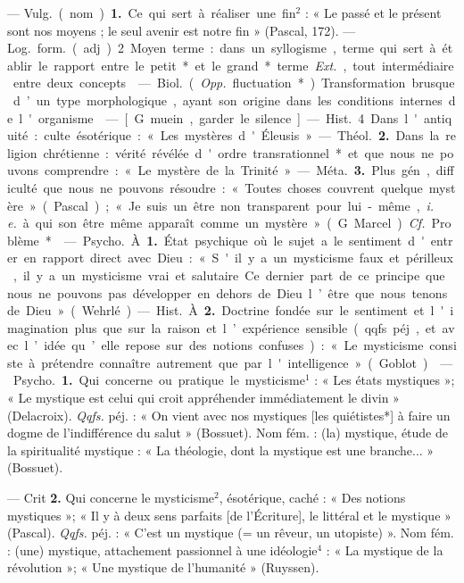\begin{itemize}[leftmargin=1cm, label=, itemsep=1pt]
 — \si{Vulg.} (nom). {\bf 1.} Ce qui sert
à réaliser une fin$^2$ : « Le passé et le
présent sont nos moyens ; le seul
avenir est notre fin » (Pascal, 172).
— \si{Log.} \si{form.} (adj). 2 Moyen
terme : dans un syllogisme, terme
qui sert à établir le rapport entre le
petit* et le grand* terme. {\it Ext.}, tout
intermédiaire entre deux concepts.

 — \si{Biol.} ({\it Opp.} fluctuation*). Transformation brusque d’un
type morphologique, ayant son origine dans les conditions internes de
l'organisme.

 — [G. muein, garder le silence]
— \si{Hist.} 4 Dans l'antiquité : culte
ésotérique : « Les mystères d'Éleusis ». — \si{Théol.} {\bf 2.} Dans la religion
chrétienne : vérité révélée d'ordre
transrationnel* et que nous ne pouvons comprendre : « Le mystère de
la Trinité ». — \si{Méta.} {\bf 3.} Plus gén.,
difficulté que nous ne pouvons
résoudre : « Toutes choses couvrent
quelque mystère » (Pascal) ; « Je
suis un être non transparent pour
lui-même, {\it i. e.} à qui son être même
apparaît comme un mystère »
(G. Marcel). {\it Cf.} Problème*.

 — \si{Psycho.} À. {\bf 1.} État
psychique où le sujet a le sentiment
d'entrer en rapport direct avec Dieu :
« S'il y a un mysticisme faux et
périlleux, il y a un mysticisme vrai
et salutaire. Ce dernier part de ce
principe que nous ne pouvons pas
développer en dehors de Dieu l’être
que nous tenons de Dieu » (Wehrlé).

— \si{Hist.} À. {\bf 2.} Doctrine fondée
sur le sentiment et l'imagination
plus que sur la raison et l’expérience
sensible (qqfs. péj., et avec l’idée
qu’elle repose sur des notions confuses) : « Le mysticisme consiste à
prétendre connaître autrement que
par l'intelligence » (Goblot).

 — \si{Psycho.} {\bf 1.} Qui concerne
ou pratique le mysticisme$^1$ : « Les
états mystiques »; « Le mystique est
celui qui croit appréhender immédiatement le divin » (Delacroix).
{\it Qqfs.} péj. : « On vient avec nos mystiques [les quiétistes*] à faire un
dogme de l'indifférence du salut »
(Bossuet). Nom fém. : (la) mystique,
étude de la spiritualité mystique :
« La théologie, dont la mystique est
une branche... » (Bossuet).

— Crit {\bf 2.} Qui concerne le mysticisme$^2$, ésotérique, caché : « Des
notions mystiques »; « Il y à deux
sens parfaits [de l'Écriture], le littéral et le mystique » (Pascal).
{\it Qqfs.} péj. : « C'est un mystique
(= un rêveur, un utopiste) ». Nom
fém. : (une) mystique, attachement
passionnel à une idéologie$^4$ : « La
mystique de la révolution »; « Une
mystique de l'humanité » (Ruyssen).


\end{itemize}
